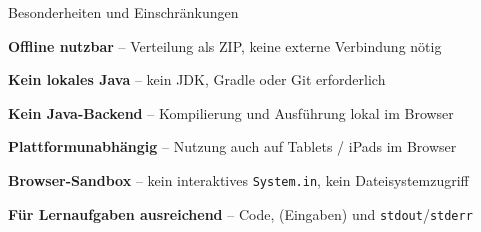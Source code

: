 \begin{itemframe}{Besonderheiten und Einschränkungen}
    \item \textbf{Offline nutzbar} -- Verteilung als ZIP, keine externe Verbindung nötig
    \vspace{1em}
    \item \textbf{Kein lokales Java} -- kein JDK, Gradle oder Git erforderlich
    \vspace{1em}
    \item \textbf{Kein Java-Backend} -- Kompilierung und Ausführung lokal im Browser
    \vspace{1em}
    \item \textbf{Plattformunabhängig} -- Nutzung auch auf Tablets / iPads im Browser
    \vspace{1em}
    \item \textbf{Browser-Sandbox} -- kein interaktives \texttt{System.in}, kein Dateisystemzugriff
    \vspace{1em}
    \item \textbf{Für Lernaufgaben ausreichend} -- Code, (Eingaben) und \texttt{stdout}/\texttt{stderr}
\end{itemframe}
